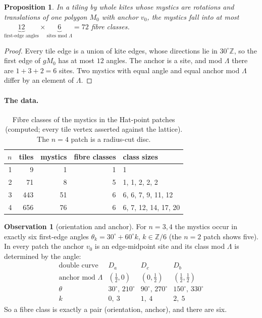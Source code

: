 \documentclass[11pt,a4paper]{article}
\newcommand{\ZZ}{\mathbb{Z}}
\newcommand{\Lam}{\Lambda}
\theoremstyle{plain}
\newtheorem{proposition}{Proposition}
\theoremstyle{definition}
\newtheorem{observation}{Observation}
\begin{document}
\begin{proposition}
\label{prop:bound}
In a tiling by whole kites whose mystics are rotations and translations of one
polygon $M_0$ with anchor $v_0$, the mystics fall into at most
$\underbrace{12}_{\text{first-edge angles}}\times\underbrace{6}_{\text{sites mod }\Lam}=72$
fibre classes.
\end{proposition}
\begin{proof}
Every tile edge is a union of kite edges, whose directions lie in $30^\circ\ZZ$,
so the first edge of $gM_0$ has at most $12$ angles. The anchor is a site, and
mod $\Lam$ there are $1+3+2=6$ sites. Two mystics with equal angle and equal
anchor mod $\Lam$ differ by an element of $\Lam$.
\end{proof}

\paragraph{The data.}

\begin{table}[htbp]
\centering
\begin{tabular}{rrrrl}
\toprule
$n$ & tiles & mystics & fibre classes & class sizes\\
\midrule
1 & 9   & 1  & 1 & 1\\
2 & 71  & 8  & 5 & 1, 1, 2, 2, 2\\
3 & 443 & 51 & 6 & 6, 6, 7, 9, 11, 12\\
4 & 656 & 76 & 6 & 6, 7, 12, 14, 17, 20\\
\bottomrule
\end{tabular}
\caption{Fibre classes of the mystics in the Hat-point patches (computed; every
tile vertex asserted against the lattice). The $n=4$ patch is a radius-cut disc.}
\label{tab:classes}
\end{table}

\begin{observation}[orientation and anchor]
\label{obs:orient}
For $n=3,4$ the mystics occur in exactly six first-edge angles
$\theta_k=30^\circ+60^\circ k$, $k\in\ZZ/6$ (the $n=2$ patch shows five). In every
patch the anchor $v_0$ is an edge-midpoint site and its class mod $\Lam$ is
determined by the angle:
\[
\begin{array}{c|ccc}
\text{double curve} & D_a & D_c & D_b\\\hline
\text{anchor mod }\Lam & (\tfrac12,0) & (0,\tfrac12) & (\tfrac12,\tfrac12)\\
\theta & 30^\circ,\,210^\circ & 90^\circ,\,270^\circ & 150^\circ,\,330^\circ\\
k & 0,\ 3 & 1,\ 4 & 2,\ 5
\end{array}
\]
So a fibre class is exactly a pair (orientation, anchor), and there are six.
\end{observation}
\end{document}
